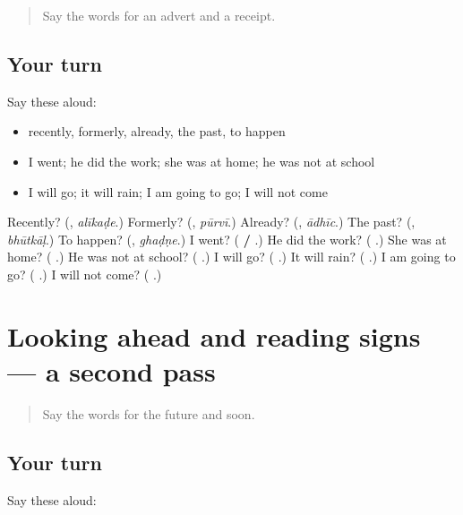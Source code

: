 \label{lesson:MR-R161-first-pass-looking-back}



\begin{quote}
Say the words for an advert and a receipt.
\end{quote}

\subsection*{Your turn}
Say these aloud:

\begin{itemize}
\raggedright
  \item recently, formerly, already, the past, to happen
  \item I went; he did the work; she was at home; he was not at school
  \item I will go; it will rain; I am going to go; I will not come
\end{itemize}

\begin{tcolorbox}[breakable,colback=teal!4,colframe=teal!35!black,title={Before you move on}]
Recently? (\textbf{}, \emph{alīkaḍe}.) Formerly? (\textbf{}, \emph{pūrvī}.) Already? (\textbf{}, \emph{ādhīc}.) The past? (\textbf{}, \emph{bhūtkāḷ}.) To happen? (\textbf{}, \emph{ghaḍṇe}.) I went? (\textbf{  / }.) He did the work? (\textbf{  }.) She was at home? (\textbf{  }.) He was not at school? (\textbf{  }.) I will go? (\textbf{ }.) It will rain? (\textbf{ }.) I am going to go? (\textbf{  }.) I will not come? (\textbf{  }.)
\end{tcolorbox}
\section[(dialogue)]{Looking ahead and reading signs — a second pass}

\label{lesson:MR-R161-second-pass-looking-ahead-and-reading-signs}



\begin{quote}
Say the words for the future and soon.
\end{quote}

\subsection*{Your turn}
Say these aloud:

